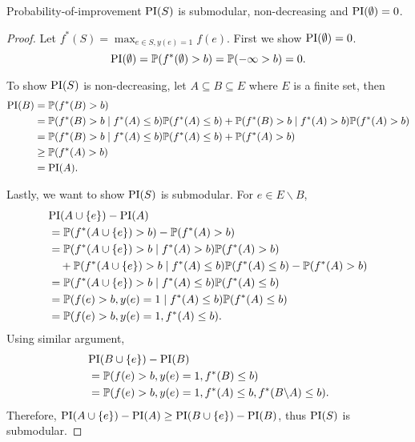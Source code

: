 \begin{lemma} \label{lemma:2}
  Probability-of-improvement $\text{PI}(S)$ is submodular, non-decreasing and $\text{PI}(\emptyset)=0$.
\end{lemma}
\begin{proof}
Let $f^*(S) = \max_{e \in S, y(e)=1} f(e)$. First we show $\text{PI}(\emptyset) = 0$.
\begin{equation*}
  \text{PI}(\emptyset) = \mathbb{P}(f^*(\emptyset) > b) = \mathbb{P}(-\infty > b)=0.
\end{equation*}

To show $\text{PI}(S)$ is non-decreasing, let $A \subseteq B \subseteq E$ where $E$ is a finite set, then
\begin{equation*}
\begin{split}
\text{PI}(B) &= \mathbb{P}(f^*(B) > b) \\
       &= \mathbb{P}(f^*(B) > b \mid f^*(A) \leq b) \mathbb{P}(f^*(A) \leq b) + \mathbb{P}(f^*(B) > b \mid f^*(A) > b) \mathbb{P}(f^*(A) > b) \\
       &= \mathbb{P}(f^*(B) > b \mid f^*(A) \leq b) \mathbb{P}(f^*(A) \leq b) + \mathbb{P}(f^*(A) > b) \\
       &\geq \mathbb{P}(f^*(A) > b) \\
       &= \text{PI}(A).
\end{split}
\end{equation*}

Lastly, we want to show $\text{PI}(S)$ is submodular. For $e \in E\backslash B$,
\begin{equation*}
  \begin{split}
    &\text{PI}(A \cup \{e\}) - \text{PI}(A) \\
    &= \mathbb{P}(f^*(A \cup \{e\}) > b) - \mathbb{P}(f^*(A) > b) \\
    &= \mathbb{P}(f^*(A \cup \{e\}) > b \mid f^*(A) > b) \mathbb{P}(f^*(A) > b) \\
    &\quad + \mathbb{P}(f^*(A \cup \{e\}) > b \mid f^*(A) \leq b)
    \mathbb{P}(f^*(A) \leq b) - \mathbb{P}(f^*(A) > b) \\
    &= \mathbb{P}(f^*(A \cup \{e\}) > b \mid f^*(A)\leq b) \mathbb{P}(f^*(A)\leq b) \\
    &= \mathbb{P}(f(e) > b, y(e) = 1 \mid f^*(A) \leq b) \mathbb{P}(f^*(A) \leq b) \\
    &= \mathbb{P}(f(e) > b, y(e) = 1, f^*(A) \leq b).
  \end{split}
\end{equation*}
Using similar argument,
\begin{equation*}
\begin{split}
&\text{PI}(B \cup \{e\}) - \text{PI}(B) \\
&= \mathbb{P}(f(e) > b, y(e)=1,f^*(B)\leq b) \\
&= \mathbb{P}(f(e) > b, y(e)=1,f^*(A)\leq b, f^*(B\backslash A) \leq b ).
\end{split}
\end{equation*}
Therefore, $\text{PI}(A \cup \{e\}) - \text{PI}(A) \geq \text{PI}(B \cup \{e\}) - \text{PI}(B)$, thus $\text{PI}(S)$ is submodular. \qedhere
\end{proof}

